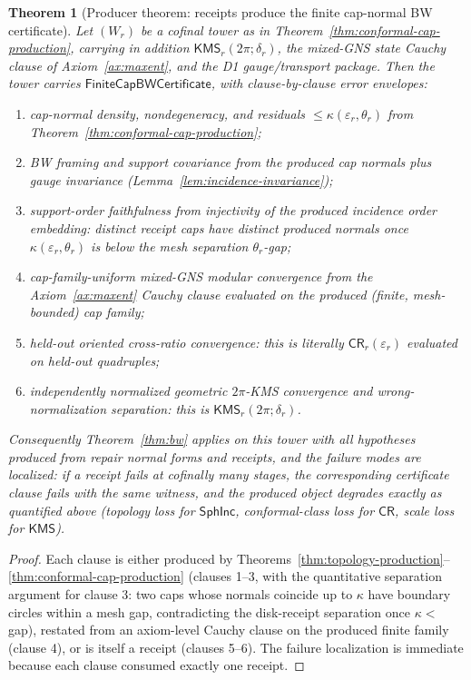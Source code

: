 \documentclass[11pt]{article}
\newtheorem{theorem}{Theorem}[section]
\begin{document}
\begin{theorem}[Producer theorem: receipts produce the finite cap-normal BW certificate]
\label{thm:certificate-production}
Let \((W_r)\) be a cofinal tower as in
Theorem~\ref{thm:conformal-cap-production}, carrying in addition
\(\mathsf{KMS}_r(2\pi;\delta_r)\), the mixed-GNS state Cauchy clause of
Axiom~\ref{ax:maxent}, and the D1 gauge/transport package. Then the tower
carries \(\mathsf{FiniteCapBWCertificate}\), with clause-by-clause error
envelopes:
\begin{enumerate}[leftmargin=2em]
\item cap-normal density, nondegeneracy, and residuals
\(\leq\kappa(\varepsilon_r,\theta_r)\) from
Theorem~\ref{thm:conformal-cap-production};
\item BW framing and support covariance from the produced cap normals plus
gauge invariance (Lemma~\ref{lem:incidence-invariance});
\item support-order faithfulness from injectivity of the produced incidence
order embedding: distinct receipt caps have distinct produced normals once
\(\kappa(\varepsilon_r,\theta_r)\) is below the mesh separation
\(\theta_r\)-gap;
\item cap-family-uniform mixed-GNS modular convergence from the
Axiom~\ref{ax:maxent} Cauchy clause evaluated on the produced (finite,
mesh-bounded) cap family;
\item held-out oriented cross-ratio convergence: this is literally
\(\mathsf{CR}_r(\varepsilon_r)\) evaluated on held-out quadruples;
\item independently normalized geometric \(2\pi\)-KMS convergence and
wrong-normalization separation: this is \(\mathsf{KMS}_r(2\pi;\delta_r)\).
\end{enumerate}
Consequently Theorem~\ref{thm:bw} applies on this tower with all hypotheses
produced from repair normal forms and receipts, and the failure modes are
localized: if a receipt fails at cofinally many stages, the corresponding
certificate clause fails with the same witness, and the produced object
degrades exactly as quantified above (topology loss for
\(\mathsf{SphInc}\), conformal-class loss for \(\mathsf{CR}\), scale loss for
\(\mathsf{KMS}\)).
\end{theorem}

\begin{proof}
Each clause is either produced by
Theorems~\ref{thm:topology-production}--\ref{thm:conformal-cap-production}
(clauses 1--3, with the quantitative separation argument for clause 3: two
caps whose normals coincide up to \(\kappa\) have boundary circles within a
mesh gap, contradicting the disk-receipt separation once
\(\kappa<\) gap), restated from an axiom-level Cauchy clause on the produced
finite family (clause 4), or is itself a receipt (clauses 5--6). The failure
localization is immediate because each clause consumed exactly one receipt.
\end{proof}
\end{document}
